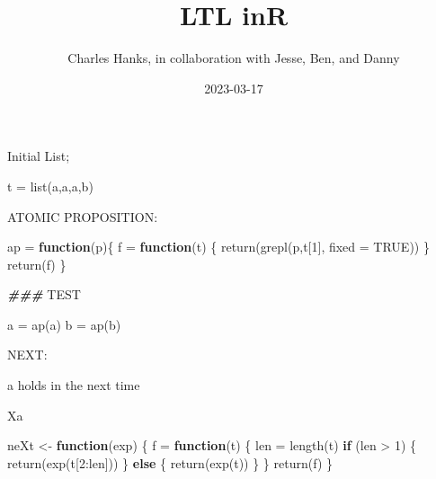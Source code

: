\documentclass[
]{article}
\title{LTL inR}
\author{Charles Hanks, in collaboration with Jesse, Ben, and Danny}
\date{2023-03-17}
\newenvironment{Shaded}{\begin{snugshade}}{\end{snugshade}}
\newcommand{\AlertTok}[1]{\textcolor[rgb]{0.94,0.16,0.16}{#1}}
\newcommand{\AttributeTok}[1]{\textcolor[rgb]{0.77,0.63,0.00}{#1}}
\newcommand{\ConstantTok}[1]{\textcolor[rgb]{0.00,0.00,0.00}{#1}}
\newcommand{\ControlFlowTok}[1]{\textcolor[rgb]{0.13,0.29,0.53}{\textbf{#1}}}
\newcommand{\DecValTok}[1]{\textcolor[rgb]{0.00,0.00,0.81}{#1}}
\newcommand{\DocumentationTok}[1]{\textcolor[rgb]{0.56,0.35,0.01}{\textbf{\textit{#1}}}}
\newcommand{\FunctionTok}[1]{\textcolor[rgb]{0.00,0.00,0.00}{#1}}
\newcommand{\NormalTok}[1]{#1}
\newcommand{\OtherTok}[1]{\textcolor[rgb]{0.56,0.35,0.01}{#1}}
\newcommand{\SpecialCharTok}[1]{\textcolor[rgb]{0.00,0.00,0.00}{#1}}
\newcommand{\StringTok}[1]{\textcolor[rgb]{0.31,0.60,0.02}{#1}}
\begin{document}
\maketitle

Initial List;

\begin{Shaded}
\begin{Highlighting}[]
\NormalTok{t }\OtherTok{=} \FunctionTok{list}\NormalTok{(}\StringTok{\textquotesingle{}a\textquotesingle{}}\NormalTok{,}\StringTok{\textquotesingle{}a\textquotesingle{}}\NormalTok{,}\StringTok{\textquotesingle{}a\textquotesingle{}}\NormalTok{,}\StringTok{\textquotesingle{}b\textquotesingle{}}\NormalTok{)}
\end{Highlighting}
\end{Shaded}

ATOMIC PROPOSITION:

\begin{Shaded}
\begin{Highlighting}[]
\NormalTok{ap }\OtherTok{=} \ControlFlowTok{function}\NormalTok{(p)\{}
\NormalTok{  f }\OtherTok{=} \ControlFlowTok{function}\NormalTok{(t)}
\NormalTok{  \{}
    \FunctionTok{return}\NormalTok{(}\FunctionTok{grepl}\NormalTok{(p,t[}\DecValTok{1}\NormalTok{], }\AttributeTok{fixed =} \ConstantTok{TRUE}\NormalTok{))}
\NormalTok{  \}}
  \FunctionTok{return}\NormalTok{(f)}
\NormalTok{\}}

\DocumentationTok{\#\#\# }\AlertTok{TEST}

\NormalTok{a }\OtherTok{=} \FunctionTok{ap}\NormalTok{(}\StringTok{\textquotesingle{}a\textquotesingle{}}\NormalTok{)}
\NormalTok{b }\OtherTok{=} \FunctionTok{ap}\NormalTok{(}\StringTok{\textquotesingle{}b\textquotesingle{}}\NormalTok{)}
\end{Highlighting}
\end{Shaded}

NEXT:

a holds in the next time

Xa

\begin{Shaded}
\begin{Highlighting}[]
\NormalTok{neXt }\OtherTok{\textless{}{-}} \ControlFlowTok{function}\NormalTok{(exp)}
\NormalTok{\{}
\NormalTok{  f }\OtherTok{=} \ControlFlowTok{function}\NormalTok{(t)}
\NormalTok{    \{}
\NormalTok{    len }\OtherTok{=} \FunctionTok{length}\NormalTok{(t)}
    \ControlFlowTok{if}\NormalTok{ (len }\SpecialCharTok{\textgreater{}} \DecValTok{1}\NormalTok{)}
\NormalTok{      \{}
      \FunctionTok{return}\NormalTok{(}\FunctionTok{exp}\NormalTok{(t[}\DecValTok{2}\SpecialCharTok{:}\NormalTok{len]))}
\NormalTok{      \} }
    \ControlFlowTok{else} 
\NormalTok{      \{}
        \FunctionTok{return}\NormalTok{(}\FunctionTok{exp}\NormalTok{(t))}
\NormalTok{      \}}
\NormalTok{    \}}
  \FunctionTok{return}\NormalTok{(f)}
\NormalTok{\}}
\end{Highlighting}
\end{Shaded}
\end{document}

